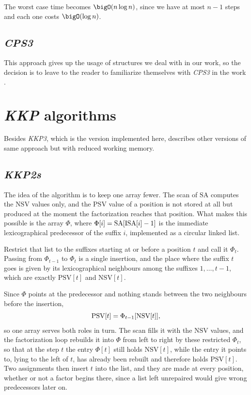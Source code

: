 The worst case time becomes \(\bigO(n \log n)\), since we have at most \(n-1\) steps and each one costs \(\bigO(\log n)\). 

\subsection{\emph{CPS3}}
This approach gives up the usage of structures we deal with in our work, so the decision is to leave to the reader to familiarize themselves with \emph{CPS3} in the work \cite{chen2008}. 


\section{\emph{KKP} algorithms}

Besides \emph{KKP3}, which is the version implemented here, \cite{kkp2012} describes other versions of same approach but with reduced working memory.

\subsection{\emph{KKP2s}}
The idea of the algorithm is to keep one array fewer. The scan of \(\mathrm{SA}\) computes the \(\mathrm{NSV}\) values only, and the \(\mathrm{PSV}\) value of a position is not stored at all but produced at the moment the factorization reaches that position. What makes this possible is the array \(\Phi\), where \(\Phi[i] = \mathrm{SA}\brackets{\mathrm{ISA}[i] - 1}\) is the immediate lexicographical predecessor of the suffix \(i\), implemented as a circular linked list.

Restrict that list to the suffixes starting at or before a position \(t\) and call it \(\Phi_t\). Passing from \(\Phi_{t-1}\) to \(\Phi_t\) is a single insertion, and the place where the suffix \(t\) goes is given by its lexicographical neighbours among the suffixes \(1, \ldots, t-1\), which are exactly \(\mathrm{PSV}[t]\) and \(\mathrm{NSV}[t]\). 

Since \(\Phi\) points at the predecessor and nothing stands between the two neighbours before the insertion,
\[
    \mathrm{PSV}[t] = \Phi_{t-1}\brackets{\mathrm{NSV}[t]},
\]
so one array serves both roles in turn. The scan fills it with the \(\mathrm{NSV}\) values, and the factorization loop rebuilds it into \(\Phi\) from left to right by these restricted \(\Phi_t\), so that at the step \(t\) the entry \(\Phi[t]\) still holds \(\mathrm{NSV}[t]\), while the entry it points to, lying to the left of \(t\), has already been rebuilt and therefore holds \(\mathrm{PSV}[t]\). Two assignments then insert \(t\) into the list, and they are made at every position, whether or not a factor begins there, since a list left unrepaired would give wrong predecessors later on.


